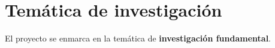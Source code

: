 
\section{Tem\'atica de investigaci\'on}

El proyecto se enmarca en la tem\'atica de {\bf investigaci\'on fundamental}.

